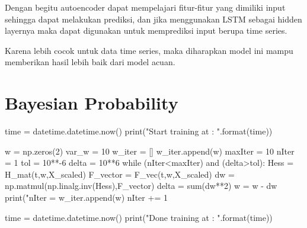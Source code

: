 Dengan begitu autoencoder dapat mempelajari fitur-fitur yang dimiliki input sehingga dapat melakukan prediksi, dan jika menggunakan LSTM sebagai hidden layernya maka dapat digunakan untuk memprediksi input berupa time series.

Karena lebih cocok untuk data time series, maka diharapkan model ini mampu memberikan hasil lebih baik dari model acuan.

\section{Bayesian Probability}

\begin{python}
    time = datetime.datetime.now()
    print("Start training at : {}".format(time))
    
    w = np.zeros(2)
    var_w = 10
    w_iter = []
    w_iter.append(w)
    maxIter = 10
    nIter = 1
    tol = 10**-6
    delta = 10**6
    while (nIter<maxIter) and (delta>tol):
        Hess = H_mat(t,w,X_scaled)
        F_vector = F_vec(t,w,X_scaled)
        dw = np.matmul(np.linalg.inv(Hess),F_vector)
        delta = sum(dw**2)
        w = w - dw
        print("nIter = %
        w_iter.append(w)
        nIter += 1
    
    time = datetime.datetime.now()
    print("Done training at : {}".format(time))

\end{python}
